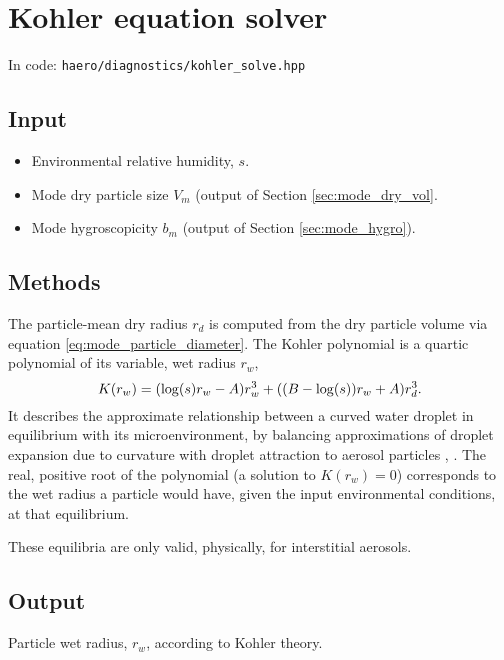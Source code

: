 \section{Kohler equation solver}

In code: \texttt{haero/diagnostics/kohler\_solve.hpp}

\subsection{Input}
  \begin{itemize}
    \item Environmental relative humidity, $s$.
    \item Mode dry particle size $V_m$ (output of Section \ref{sec:mode_dry_vol}.
    \item Mode hygroscopicity $b_m$ (output of Section \ref{sec:mode_hygro}).
  \end{itemize}
  
\subsection{Methods}

The particle-mean dry radius $r_d$ is computed from the dry particle volume via equation \eqref{eq:mode_particle_diameter}.
The Kohler polynomial is a quartic polynomial of its variable, wet radius $r_w$,
\begin{equation}\labeleq{kohler}
  K(r_w) = (\log(s)r_w - A)r_w^3 + ((B-\log(s))r_w + A)r_d^3.
\end{equation}  
It describes the approximate relationship between a curved water droplet in equilibrium with its microenvironment, by balancing approximations of droplet expansion due to curvature with droplet attraction to aerosol particles \cite[\S 3.5.4]{LambVerlinde}, \cite[\S 6.5]{PruppacherKlett}.
The real, positive root of the polynomial (a solution to $K(r_w) = 0$) corresponds to the wet radius a particle would have, given the input environmental conditions, at that equilibrium.

These equilibria are only valid, physically, for interstitial aerosols.

\subsection{Output}

Particle wet radius, $r_w$, according to Kohler theory.